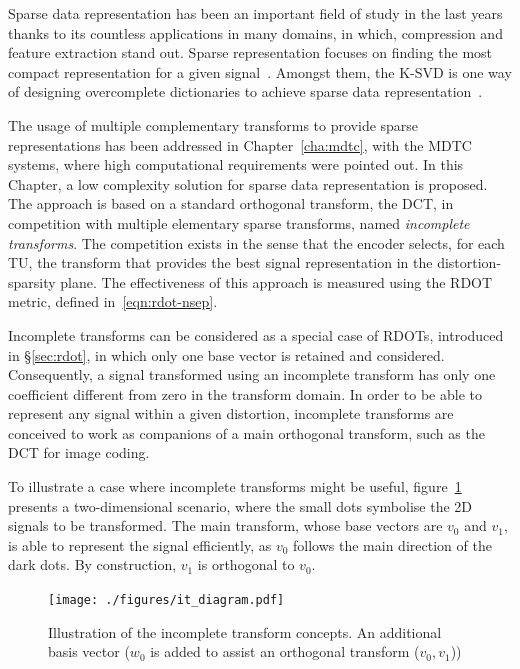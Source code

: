 \documentclass[11pt,a4paper,openright,twoside]{book}
\numberwithin{equation}{section} %
\numberwithin{figure}{section} %
\numberwithin{table}{section} %
\begin{document}
Sparse data representation has been an important field of study in the last
years thanks to its countless applications in many domains, in which,
compression and feature extraction stand out.
Sparse representation focuses on finding the most compact representation for a
given signal~\cite{huang-06-sparse-representation}.
Amongst them, the K-\acs{SVD} is one way of designing overcomplete
dictionaries to achieve sparse data
representation~\cite{aharon-06-overcomplete-sparse-dict}.

The usage of multiple complementary transforms to provide sparse
representations has been addressed in Chapter~\ref{cha:mdtc}, with the
\ac{MDTC} systems, where high computational requirements were pointed out.
In this Chapter, a low complexity solution for sparse data representation is
proposed.
The approach is based on a standard orthogonal transform, the \acf{DCT}, in
competition with multiple elementary sparse transforms, named \emph{incomplete
transforms}.
The competition exists in the sense that the encoder selects, for each
\ac{TU}, the transform that provides the best signal representation in the
distortion-sparsity plane.
The effectiveness of this approach is measured using the \ac{RDOT} metric,
defined in~\ref{eqn:rdot-nsep}.

Incomplete transforms can be considered as a special case of \acfp{RDOT},
introduced in \S\ref{sec:rdot}, in which
only one base vector is retained and considered.
Consequently, a signal transformed using an incomplete transform has only one
coefficient different from zero in the transform domain.
In order to be able to represent any signal within a given distortion,
incomplete transforms are conceived to work as companions of a main orthogonal
transform, such as the \ac{DCT} for image coding.

To illustrate a case where incomplete transforms might be useful,
figure~\ref{fig:it_diagram} presents a two-dimensional scenario, where the
small dots symbolise the 2D signals to be transformed.
The main transform, whose base vectors are $v_0$ and $v_1$, is able to
represent the signal efficiently, as $v_0$ follows the main direction of the
dark dots.
By construction, $v_1$ is orthogonal to $v_0$.

\begin{figure}[tp]
	\centering
	\texttt{[image: ./figures/it\_diagram.pdf]}
	\caption{Illustration of the incomplete transform concepts.
	An additional basis vector ($w_0$ is added to assist an orthogonal
	transform ($v_0,v_1$))}
	\label{fig:it_diagram}
\end{figure}
\end{document}

